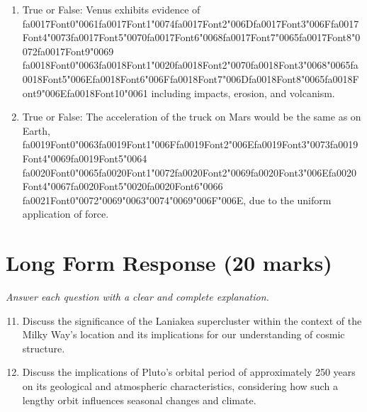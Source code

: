 \documentclass[12pt]{article}
\begin{document}
\begin{enumerate}[label=\arabic*.]
\item True or False: Venus exhibits evidence of {\csname fa0017Font0\endcsname\char"0061}{\csname fa0017Font1\endcsname\char"0074}{\csname fa0017Font2\endcsname\char"006D}{\csname fa0017Font3\endcsname\char"006F}{\csname fa0017Font4\endcsname\char"0073}{\csname fa0017Font5\endcsname\char"0070}{\csname fa0017Font6\endcsname\char"0068}{\csname fa0017Font7\endcsname\char"0065}{\csname fa0017Font8\endcsname\char"0072}{\csname fa0017Font9\endcsname\char"0069} {\csname fa0018Font0\endcsname\char"0063}{\csname fa0018Font1\endcsname\char"0020}{\csname fa0018Font2\endcsname\char"0070}{\csname fa0018Font3\endcsname\char"0068}{\char"0065}{\csname fa0018Font5\endcsname\char"006E}{\csname fa0018Font6\endcsname\char"006F}{\csname fa0018Font7\endcsname\char"006D}{\csname fa0018Font8\endcsname\char"0065}{\csname fa0018Font9\endcsname\char"006E}{\csname fa0018Font10\endcsname\char"0061} including impacts, erosion, and volcanism.
\item True or False: The acceleration of the truck on Mars would be the same as on Earth, {\csname fa0019Font0\endcsname\char"0063}{\csname fa0019Font1\endcsname\char"006F}{\csname fa0019Font2\endcsname\char"006E}{\csname fa0019Font3\endcsname\char"0073}{\csname fa0019Font4\endcsname\char"0069}{\csname fa0019Font5\endcsname\char"0064} {\csname fa0020Font0\endcsname\char"0065}{\csname fa0020Font1\endcsname\char"0072}{\csname fa0020Font2\endcsname\char"0069}{\csname fa0020Font3\endcsname\char"006E}{\csname fa0020Font4\endcsname\char"0067}{\csname fa0020Font5\endcsname\char"0020}{\csname fa0020Font6\endcsname\char"0066} {\csname fa0021Font0\endcsname\char"0072}{\char"0069}{\char"0063}{\char"0074}{\char"0069}{\char"006F}{\char"006E}, due to the uniform application of force.
\end{enumerate}

\section*{Long Form Response (20 marks)}
\textit{Answer each question with a clear and complete explanation.}
\begin{enumerate}[label=\arabic*.]
\setcounter{enumi}{10}
\item Discuss the significance of the Laniakea supercluster within the context of the Milky
Way's location and its implications for our understanding of cosmic structure.
\item Discuss the implications of Pluto's orbital period of approximately 250 years on its
geological and atmospheric characteristics, considering how such a lengthy orbit
influences seasonal changes and climate.
\end{enumerate}
\end{document}

